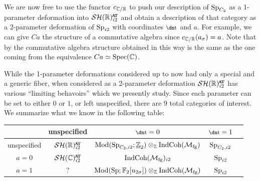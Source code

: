 We are now free to use the functor $c_{\mathbb{C}/\mathbb{R}}$ to push our description of $\operatorname{\mathrm{Sp}}_{C_2}$ as a 1-parameter deformation into $\SHRat$ and obtain a description of that category as a 2-parameter deformation of $\operatorname{\mathrm{Sp}}_{i2}$ with coordinates $\ta$ and $a$. For example, we can give $Ca$ the structure of a commutative algebra since $c_{\mathbb{C}/\mathbb{R}}(a_\sigma) = a$. Note that by  the commutative algebra structure obtained in this way is the same as the one coming from the equivalence $Ca \simeq \operatorname{\mathrm{Spec}}(\mathbb{C})$. 

While the 1-parameter deformations considered up to now had only a special and a generic fiber, when considered as a 2-parameter deformation $\SHRat$ has various ``limiting behavoirs'' which we presently study. Since each parameter can be set to either $0$ or $1$,
or left unspecified, there are 9 total categories of interest.
We summarize what we know in the following table:

{\renewcommand{\arraystretch}{1.4}
\begin{center}
  \begin{tabular}{|c|c|c|c|c|} \hline
    & unspecified & $\ta = 0$ & $\ta = 1$ \\\hline
    unspecified & $\SHRat$ & $\mathrm{Mod}(\operatorname{\mathrm{Sp}}_{C_2, i2} ; \underline{\mathbb{Z}}_{2}) \otimes_{\mathbb{Z}} \mathrm{IndCoh} ( \mathcal{M}_{\mathrm{fg}} )$ & $\operatorname{\mathrm{Sp}}_{C_2,i2}$ \\\hline
    $a = 0$ & $\SHC^{\at}_{i2}$ & $\mathrm{IndCoh} ( \mathcal{M}_{\mathrm{fg}} )_{i2}$ & $\operatorname{\mathrm{Sp}}_{i2}$ \\\hline
    $a = 1$ & ? & $\mathrm{Mod}(\operatorname{\mathrm{Sp}} ; \operatorname{\mathbb{F}}_2[u_{2\sigma}]) \otimes_{\mathbb{Z}} \mathrm{IndCoh} ( \mathcal{M}_{\mathrm{fg}} )$ & $\operatorname{\mathrm{Sp}}_{i2}$ \\\hline
  \end{tabular}
\end{center}
}



